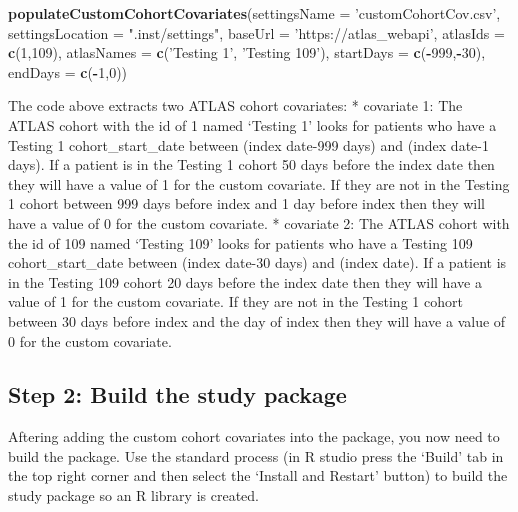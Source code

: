 \documentclass[
]{article}
\newenvironment{Shaded}{\begin{snugshade}}{\end{snugshade}}
\newcommand{\DataTypeTok}[1]{\textcolor[rgb]{0.13,0.29,0.53}{#1}}
\newcommand{\DecValTok}[1]{\textcolor[rgb]{0.00,0.00,0.81}{#1}}
\newcommand{\KeywordTok}[1]{\textcolor[rgb]{0.13,0.29,0.53}{\textbf{#1}}}
\newcommand{\NormalTok}[1]{#1}
\newcommand{\OperatorTok}[1]{\textcolor[rgb]{0.81,0.36,0.00}{\textbf{#1}}}
\newcommand{\StringTok}[1]{\textcolor[rgb]{0.31,0.60,0.02}{#1}}
\begin{document}
\begin{Shaded}
\begin{Highlighting}[]
\KeywordTok{populateCustomCohortCovariates}\NormalTok{(}\DataTypeTok{settingsName =} \StringTok{'customCohortCov.csv'}\NormalTok{,}
                               \DataTypeTok{settingsLocation =} \StringTok{".inst/settings"}\NormalTok{,}
                               \DataTypeTok{baseUrl =} \StringTok{'https://atlas_webapi'}\NormalTok{,}
                               \DataTypeTok{atlasIds =} \KeywordTok{c}\NormalTok{(}\DecValTok{1}\NormalTok{,}\DecValTok{109}\NormalTok{),}
                               \DataTypeTok{atlasNames =} \KeywordTok{c}\NormalTok{(}\StringTok{'Testing 1'}\NormalTok{, }\StringTok{'Testing 109'}\NormalTok{),}
                               \DataTypeTok{startDays =} \KeywordTok{c}\NormalTok{(}\OperatorTok{-}\DecValTok{999}\NormalTok{,}\OperatorTok{-}\DecValTok{30}\NormalTok{),}
                               \DataTypeTok{endDays =} \KeywordTok{c}\NormalTok{(}\OperatorTok{-}\DecValTok{1}\NormalTok{,}\DecValTok{0}\NormalTok{))}
\end{Highlighting}
\end{Shaded}

The code above extracts two ATLAS cohort covariates: * covariate 1: The
ATLAS cohort with the id of 1 named `Testing 1' looks for patients who
have a Testing 1 cohort\_start\_date between (index date-999 days) and
(index date-1 days). If a patient is in the Testing 1 cohort 50 days
before the index date then they will have a value of 1 for the custom
covariate. If they are not in the Testing 1 cohort between 999 days
before index and 1 day before index then they will have a value of 0 for
the custom covariate. * covariate 2: The ATLAS cohort with the id of 109
named `Testing 109' looks for patients who have a Testing 109
cohort\_start\_date between (index date-30 days) and (index date). If a
patient is in the Testing 109 cohort 20 days before the index date then
they will have a value of 1 for the custom covariate. If they are not in
the Testing 1 cohort between 30 days before index and the day of index
then they will have a value of 0 for the custom covariate.

\hypertarget{step-2-build-the-study-package}{%
\subsection{Step 2: Build the study
package}\label{step-2-build-the-study-package}}

Aftering adding the custom cohort covariates into the package, you now
need to build the package. Use the standard process (in R studio press
the `Build' tab in the top right corner and then select the `Install and
Restart' button) to build the study package so an R library is created.
\end{document}
